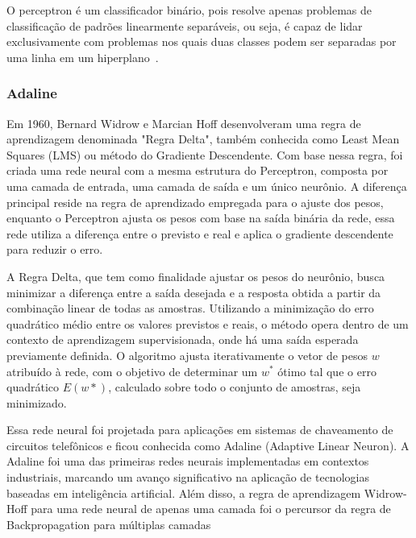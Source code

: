             O perceptron é um classificador binário, pois resolve apenas problemas de classificação de padrões 
            linearmente separáveis, ou seja, é capaz de lidar exclusivamente com problemas nos quais duas classes 
            podem ser separadas por uma linha em um hiperplano~\cite{haykin2009neural}. 


        \subsubsection{Adaline}

            Em 1960, Bernard Widrow e Marcian Hoff desenvolveram uma regra de aprendizagem denominada "Regra Delta", 
            também conhecida como Least Mean Squares (LMS) ou método do Gradiente Descendente. Com base nessa regra, 
            foi criada uma rede neural com a mesma estrutura do Perceptron, composta por uma camada de entrada, uma 
            camada de saída e um único neurônio. A diferença principal reside na regra de aprendizado empregada para 
            o ajuste dos pesos, enquanto o Perceptron ajusta os pesos com base na saída binária da rede, essa rede
            utiliza a diferença entre o previsto e real e aplica o gradiente descendente para reduzir o erro.
            
            A Regra Delta, que tem como finalidade ajustar os pesos do neurônio, busca minimizar a diferença entre a 
            saída desejada e a resposta obtida a partir da combinação linear de todas as amostras. Utilizando a 
            minimização do erro quadrático médio entre os valores previstos e reais, o método opera dentro de um 
            contexto de aprendizagem supervisionada, onde há uma saída esperada previamente definida. O algoritmo 
            ajusta iterativamente o vetor de pesos \( w\) atribuído à rede, com o objetivo de determinar um 
            \( w^{*} \) ótimo tal que o erro quadrático \({E(w{*})}\), calculado sobre todo o conjunto de amostras, 
            seja minimizado.

            Essa rede neural foi projetada para aplicações em sistemas de chaveamento de circuitos telefônicos e 
            ficou conhecida como Adaline (Adaptive Linear Neuron). A Adaline foi uma das primeiras redes neurais 
            implementadas em contextos industriais, marcando um avanço significativo na aplicação de tecnologias 
            baseadas em inteligência artificial. Além disso, a regra de aprendizagem Widrow-Hoff para uma rede neural 
            de apenas uma camada foi o percursor da regra de Backpropagation para múltiplas camadas~\cite{Fausett1994,silva2010}
        
